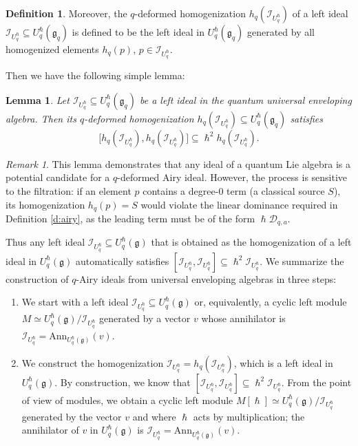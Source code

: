 \documentclass[reqno,11pt]{amsart}
\theoremstyle{plain}
\newtheorem{lemma}[theorem]{Lemma}
\theoremstyle{definition}
\newtheorem{definition}[theorem]{Definition}
\theoremstyle{remark}
\newtheorem{remark}[theorem]{Remark}
\numberwithin{equation}{section}
\newcommand{\1}{\mathds{1}}
\newcommand{\2}{\frac{1}{2}}
\begin{document}
{\begin{definition}
					{Moreover, the $q$-deformed  homogenization $h_q(\mathcal{I}_{U_q^\hslash})$ of a left ideal $\mathcal{I}_{U_q^\hslash} \subseteq U_q^\hslash(\mathfrak{g}_q)$ is defined to be the left ideal in $U_q^\hslash(\mathfrak{g}_q)$ generated by all homogenized elements $h_q(p)$, $p \in \mathcal{I}_{U_q^\hslash}$}. 
				\end{definition}
				Then we have the following simple lemma:
				
				\begin{lemma}\label{l:hom}
					Let $\mathcal{I}_{U_q^\hslash} \subseteq U_q^\hslash(\mathfrak{g}_q)$ be a left ideal {in the  quantum universal enveloping algebra}. Then its  $q$-deformed homogenization $h_q(\mathcal{I}_{U_q^\hslash}) \subseteq U_q^\hslash(\mathfrak{g}_q)$ satisfies \begin{equation}
						\big[h_q(\mathcal{I}_{U_q^\hslash}), h_q(\mathcal{I}_{U_q^\hslash})\big] \subseteq \hslash^2 h_q(\mathcal{I}_{U_q^\hslash}).
					\end{equation}
				\end{lemma}
				\begin{remark}
					This lemma demonstrates that any ideal of a quantum Lie algebra is a potential candidate for a $q$-deformed Airy ideal. However, the process is sensitive to the filtration: if an element $p$ contains a degree-$0$ term (a classical source $S$), its homogenization $h_q(p) = S$ would violate the linear dominance required in Definition \ref{d:airy}, as the leading term must be of the form $\hslash \mathcal{D}_{q,a}$.
				\end{remark}
				Thus any left ideal $\mathcal{I}_{U^\hslash_q} \subseteq U^\hslash_q(\mathfrak{g})$ that is obtained as the homogenization of a left ideal in $U_q^\hslash(\mathfrak{g})$ automatically satisfies $[\mathcal{I}_{U^\hslash_q},\mathcal{I}_{U^\hslash_q}] \subseteq \hslash^2\mathcal{I}_{U^\hslash_q}$. 
				We summarize the construction of  $q$-Airy ideals from universal enveloping algebras in three steps:
				\begin{enumerate}
					\item We start with a left ideal $\mathcal{I}_{U_q^\hslash} \subseteq U_q^\hslash(\mathfrak{g})$ or, equivalently, a cyclic left module $M \simeq U_q^\hslash(\mathfrak{g})/ \mathcal{I}_{U_q^\hslash}$ generated by a vector $v$ whose annihilator is $\mathcal{I}_{U_q^\hslash} = \text{Ann}_{U_q^\hslash(\mathfrak{g})}(v)$.
					\item We construct the homogenization $\mathcal{I}_{U^\hslash_q}= h_q(\mathcal{I}_{U_q^\hslash})$, which is a left ideal in $U^\hslash_q(\mathfrak{g})$.  By construction, we know that $[\mathcal{I}_{U^\hslash_q}, \mathcal{I}_{U^\hslash_q}] \subseteq \hslash^2 \mathcal{I}_{U^\hslash_q}$. From the point of view of modules, we obtain a cyclic left module $M[\hslash] \simeq U^\hslash_q(\mathfrak{g})/\mathcal{I}_{U^\hslash_q}$ generated by the vector $v$ and where $\hslash$ acts by multiplication; the annihilator of $v$ in $U^\hslash_q(\mathfrak{g})$ is $\mathcal{I}_{U^\hslash_q} = \text{Ann}_{U^\hslash_q(\mathfrak{g})}(v)$.

\end{enumerate}}
\end{document}
